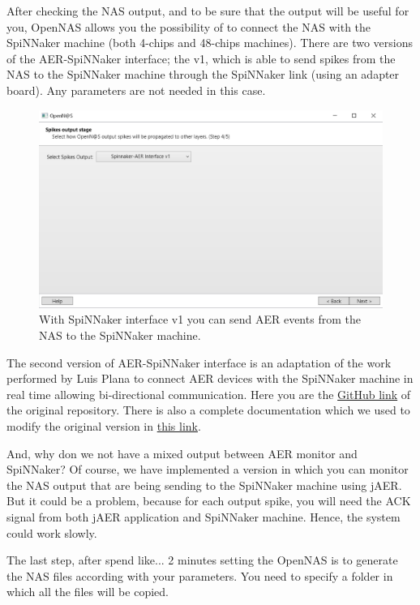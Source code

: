 After checking the NAS output, and to be sure that the output will be useful for you, OpenNAS allows you the possibility of to connect the NAS with the SpiNNaker machine (both 4-chips and 48-chips machines). There are two versions of the AER-SpiNNaker interface; the v1, which is able to send spikes from the NAS to the SpiNNaker machine through the SpiNNaker link (using an adapter board). Any parameters are not needed in this case.

\begin{figure}[H]
\centering
\includegraphics[width=1\textwidth]{images/Img23_S4_OutInterface_2.PNG}
\caption{\label{fig:OpenNAS_s4_spinnv1}With SpiNNaker interface v1 you can send AER events from the NAS to the SpiNNaker machine.}
\end{figure}

The second version of AER-SpiNNaker interface is an adaptation of the work performed by Luis Plana to connect AER devices with the SpiNNaker machine in real time allowing bi-directional communication. Here you are the \textcolor{blue}{\href{https://github.com/SpiNNakerManchester/spio}{GitHub link}} of the original repository. There is also a complete documentation which we used to modify the original version in \textcolor{blue}{\href{http://spinnakermanchester.github.io/docs/fpga_aer/}{this link}}.

And, why don we not have a mixed output between AER monitor and SpiNNaker? Of course, we have implemented a version in which you can monitor the NAS output that are being sending to the SpiNNaker machine using jAER. But it could be a problem, because for each output spike, you will need the ACK signal from both jAER application and SpiNNaker machine. Hence, the system could work slowly.

The last step, after spend like... 2 minutes setting the OpenNAS is to generate the NAS files according with your parameters. You need to specify a folder in which all the files will be copied.

